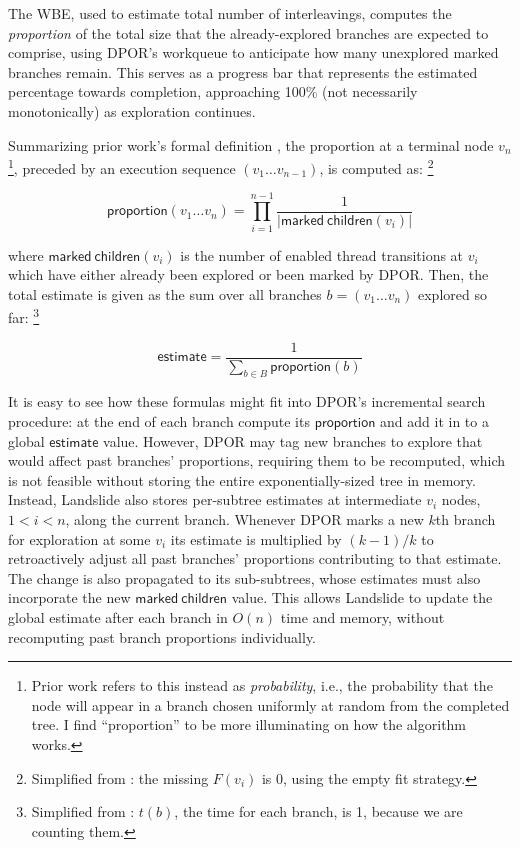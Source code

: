 The WBE, used to estimate total number of interleavings,
computes the {\em proportion} of the total size
that the already-explored branches are expected to comprise,
using DPOR's workqueue to anticipate how many unexplored marked branches remain.
This serves as a progress bar \cite{progress-bar} that represents the estimated percentage towards completion,
approaching 100\% (not necessarily monotonically) as exploration continues.

Summarizing prior work's formal definition \cite{estimation},
the proportion at a terminal node $v_n$%
\footnote{Prior work \cite{estimating-search-tree-size,estimation} refers to this instead as {\em probability},
i.e., the probability that the node will appear in a branch chosen uniformly at random from the completed tree.
I find ``proportion'' to be more illuminating on how the algorithm works.
},
preceded by an execution sequence $(v_1 \dots v_{n-1})$,
is computed as:%
\footnote{
Simplified from \cite{estimation}: the missing $F(v_i)$ is 0, using the empty fit strategy.
}

\[
	\mathsf{proportion}(v_1 \dots v_n) = \displaystyle\prod_{i=1}^{n-1} \frac{1}{|\mathsf{marked~children}(v_i)|}
\]

where $\mathsf{marked~children}(v_i)$ is the number of enabled thread transitions at $v_i$
which have either already been explored or been marked by DPOR.
Then, the total estimate is given as the sum over all branches $b = (v_1 \dots v_n)$ explored so far:%
\footnote{
Simplified from \cite{estimation}: $t(b)$, the time for each branch, is 1, because we are counting them.
}

\[
	\mathsf{estimate} = \frac{1}{\sum_{b \in B} \mathsf{proportion}(b)}
\]

It is easy to see how these formulas might fit into DPOR's incremental search procedure:
at the end of each branch compute its $\mathsf{proportion}$ and add it in to a global $\mathsf{estimate}$ value.
However, DPOR may tag new branches to explore that would affect past branches' proportions,
requiring them to be recomputed,
which is not feasible without storing the entire exponentially-sized tree in memory.
Instead, Landslide also stores per-subtree estimates at intermediate $v_i$ nodes, $1 < i < n$,
along the current branch.
Whenever DPOR marks a new $k$th branch for exploration
at some $v_i$
its estimate
is multiplied by $(k-1)/k$ to retroactively adjust all past branches' proportions contributing to that estimate.
The change is also propagated to its sub-subtrees,
whose estimates must also incorporate the new $\mathsf{marked~children}$ value.
This allows Landslide to update the global estimate after each branch in $O(n)$ time and memory,
without recomputing past branch proportions individually.

